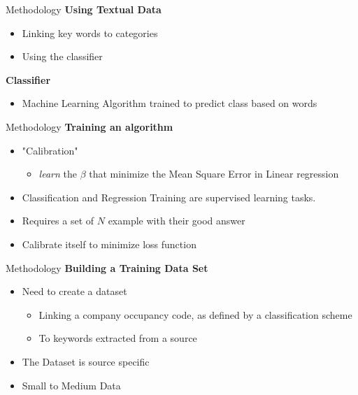 \begin{frame}[label=metho]{Methodology}
	\textbf{Using Textual Data}
	\begin{itemize}
		\item Linking key words to categories 
		\item Using the classifier
	\end{itemize}	
	
	\textbf{Classifier}
	\begin{itemize}
		\item Machine Learning Algorithm trained to predict class based on words
	\end{itemize}	
	
\end{frame}


\begin{frame}[label=metho]{Methodology}
	\textbf{Training an algorithm}
	\begin{itemize}
			\item "Calibration"
		\begin{itemize}
			
		\item \textit{learn} the $\beta$ that minimize the Mean Square Error in Linear regression
			\end{itemize}	
		
	
		\item Classification and Regression Training are supervised learning tasks.
		\item Requires a set of $N$ example with their good answer
		\item Calibrate itself to minimize loss function
	\end{itemize}	
	
\end{frame}


\begin{frame}[label=metho]{Methodology}
	\textbf{Building a Training Data Set}
	\begin{itemize}
		\item Need to create a dataset 
		\begin{itemize}
			\item Linking a company occupancy code, as defined by a classification scheme
			\item To keywords extracted from a source
		\end{itemize}	
		\item The Dataset is source specific
		\item Small to Medium Data
	
	\end{itemize}	
\end{frame}


